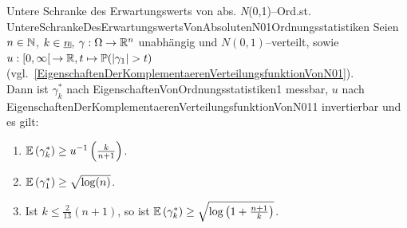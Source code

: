 \begin{satz}{Untere Schranke des Erwartungswerts von abs.
\textsl{N}(0,1)--Ord.st.}
{UntereSchrankeDesErwartungswertsVonAbsolutenN01Ordnungsstatistiken}
Seien $n \in \mathbb{N}$, $k \in \haken n$, $\gamma: \Omega \rightarrow \mathbb{R}^n$
unabhängig und $N(0,1)$--verteilt, sowie $u: [0, \infty[\!\ \rightarrow \R, 
t \mapsto \Prim(\abs{\gamma_1}> t)$
(vgl.~\ref{EigenschaftenDerKomplementaerenVerteilungsfunktionVonN01}).\\
Dann ist $\gamma_k^\ast$ nach
{EigenschaftenVonOrdnungsstatistiken1} messbar, $u$ nach
{EigenschaftenDerKomplementaerenVerteilungsfunktionVonN011} invertierbar und es
gilt:
\begin{enumerate}[(1)]
  \item
   \label{UntereSchrankeDesErwartungswertsVonAbsolutenN01Ordnungsstatistiken1}
	$\mathbb{E}\left(\gamma_k^\ast \right) \ge u^{-1}\left(\frac k {n+1} \right)$.
	\item
	 \label{UntereSchrankeDesErwartungswertsVonAbsolutenN01Ordnungsstatistiken2}
	 $\mathbb{E}\left(\gamma_1^\ast \right)\ge \sqrt{\log(n)}$.
	 \item
	 \label{UntereSchrankeDesErwartungswertsVonAbsolutenN01Ordnungsstatistiken3}
	 Ist $k \le \frac 2 {13}(n+1)$, so ist
	 $\mathbb{E}\left(\gamma_k^\ast \right) \ge \sqrt{\log\left(1+\frac{n+1}k \right)}$.
\end{enumerate}
\end{satz}
